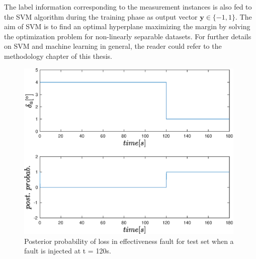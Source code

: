 The label information corresponding to the measurement instances is also fed to the SVM algorithm during the training phase as output vector $\bm{y} \in \{-1,1\}$. 
The aim of SVM is to find an optimal hyperplane maximizing the margin by solving the optimization problem for non-linearly separable datasets. For further details on SVM and machine learning in general, the reader could refer to the methodology chapter of this thesis.

\begin{figure}
\begin{center}
\includegraphics[width=11cm]{figures/post_prob}    %
\caption{Posterior probability of loss in effectiveness fault for test set when a fault is injected at t = 120s.} 
\label{fig:post_prob}
\end{center}
\end{figure}

